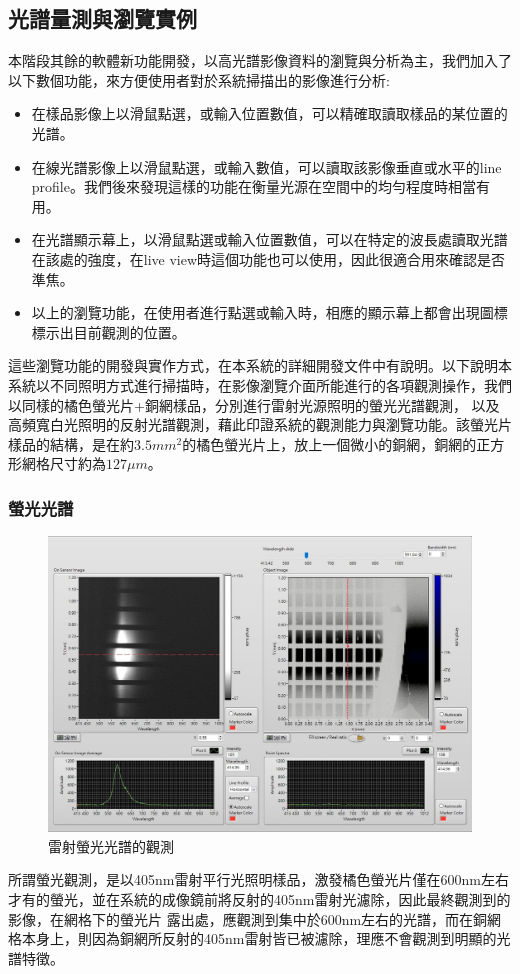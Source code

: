 \documentclass[12pt]{article}
\begin{document}
\subsection{光譜量測與瀏覽實例}
本階段其餘的軟體新功能開發，以高光譜影像資料的瀏覽與分析為主，我們加入了以下數個功能，來方便使用者對於系統掃描出的影像進行分析:
\begin{itemize}
    \item 在樣品影像上以滑鼠點選，或輸入位置數值，可以精確取讀取樣品的某位置的光譜。
    \item 在線光譜影像上以滑鼠點選，或輸入數值，可以讀取該影像垂直或水平的line profile。我們後來發現這樣的功能在衡量光源在空間中的均勻程度時相當有用。
    \item 在光譜顯示幕上，以滑鼠點選或輸入位置數值，可以在特定的波長處讀取光譜在該處的強度，在live view時這個功能也可以使用，因此很適合用來確認是否準焦。
    \item 以上的瀏覽功能，在使用者進行點選或輸入時，相應的顯示幕上都會出現圖標標示出目前觀測的位置。
\end{itemize}
這些瀏覽功能的開發與實作方式，在本系統的詳細開發文件中有說明。\cite{sysDoc}以下說明本系統以不同照明方式進行掃描時，在影像瀏覽介面所能進行的各項觀測操作，我們以同樣的橘色螢光片+銅網樣品，分別進行雷射光源照明的螢光光譜觀測，
以及高頻寬白光照明的反射光譜觀測，藉此印證系統的觀測能力與瀏覽功能。該螢光片樣品的結構，是在約$3.5mm^2$的橘色螢光片上，放上一個微小的銅網，銅網的正方形網格尺寸約為$127\mu m$。
\subsubsection{螢光光譜}
\begin{figure}
    \centering
    \includegraphics[width = \linewidth]{flourence.jpeg}
    \caption{雷射螢光光譜的觀測}
    \label{fig: flourence}
\end{figure}
所謂螢光觀測，是以405nm雷射平行光照明樣品，激發橘色螢光片僅在600nm左右才有的螢光，並在系統的成像鏡前將反射的405nm雷射光濾除，因此最終觀測到的影像，在網格下的螢光片
露出處，應觀測到集中於600nm左右的光譜，而在銅網格本身上，則因為銅網所反射的405nm雷射皆已被濾除，理應不會觀測到明顯的光譜特徵。
\end{document}
